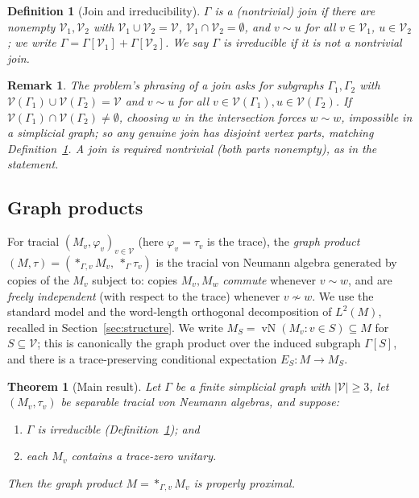 \documentclass[11pt]{article}
\newtheorem{theorem}{Theorem}
\newtheorem{definition}{Definition}
\newtheorem{remark}{Remark}
\DeclareMathOperator{\vN}{vN}
\newcommand{\Gra}{\Gamma}
\newcommand{\VV}{\mathcal V}
\newcommand{\abs}[1]{\lvert #1\rvert}
\begin{document}
\begin{definition}[Join and irreducibility]\label{def:join}
$\Gra$ is a \emph{(nontrivial) join} if there are nonempty $\VV_1,\VV_2$ with
$\VV_1\cup\VV_2=\VV$, $\VV_1\cap\VV_2=\emptyset$, and $v\sim u$ for all $v\in\VV_1$, $u\in\VV_2$;
we write $\Gra=\Gra[\VV_1]+\Gra[\VV_2]$. We say $\Gra$ is \emph{irreducible} if it is not a nontrivial join.
\end{definition}

\begin{remark}\label{rem:join-statement}
The problem's phrasing of a join asks for subgraphs $\Gra_1,\Gra_2$ with
$\VV(\Gra_1)\cup\VV(\Gra_2)=\VV$ and $v\sim u$ for all $v\in\VV(\Gra_1),u\in\VV(\Gra_2)$. If
$\VV(\Gra_1)\cap\VV(\Gra_2)\ne\emptyset$, choosing $w$ in the intersection forces $w\sim w$, impossible in a
simplicial graph; so any genuine join has disjoint vertex parts, matching Definition~\ref{def:join}. A join
is required nontrivial (both parts nonempty), as in the statement.
\end{remark}

\subsection*{Graph products}

For tracial $(M_v,\varphi_v)_{v\in\VV}$ (here $\varphi_v=\tau_v$ is the trace), the
\emph{graph product} $(M,\tau)=(\ast_{\Gra,v}M_v,\ \ast_{\Gra}\tau_v)$ is the tracial von Neumann algebra
generated by copies of the $M_v$ subject to: copies $M_v,M_w$ \emph{commute} whenever $v\sim w$, and are
\emph{freely independent} (with respect to the trace) whenever $v\not\sim w$. We use the standard model and
the word-length orthogonal decomposition of $L^2(M)$, recalled in Section~\ref{sec:structure}. We write
$M_S=\vN(M_v:v\in S)\subseteq M$ for $S\subseteq\VV$; this is canonically the graph product over the induced
subgraph $\Gra[S]$, and there is a trace-preserving conditional expectation $E_S:M\to M_S$.

\medskip

\begin{theorem}[Main result]\label{thm:main}
Let $\Gra$ be a finite simplicial graph with $\abs{\VV}\ge 3$, let $(M_v,\tau_v)$ be separable tracial von
Neumann algebras, and suppose:
\begin{enumerate}
\item[(a)] $\Gra$ is irreducible (Definition~\ref{def:join}); and
\item[(b)] each $M_v$ contains a trace-zero unitary.
\end{enumerate}
Then the graph product $M=\ast_{\Gra,v}M_v$ is properly proximal.
\end{theorem}
\end{document}
